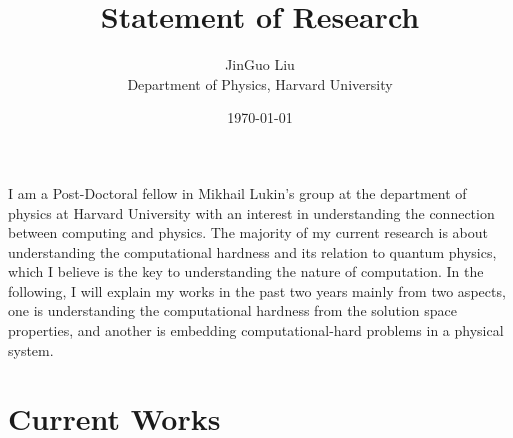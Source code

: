 \documentclass[a4paper]{article}
\title{Statement of Research}
\author{JinGuo Liu\\ Department of Physics, Harvard University}
\date{\today}
\newcommand{\<}{\langle}
\renewcommand{\>}{\rangle}
\begin{document}
\fontsize{10}{13}
\selectfont
\maketitle

I am a Post-Doctoral fellow in Mikhail Lukin's group at the department of physics at Harvard University with an interest in understanding the connection between computing and physics.
The majority of my current research is about understanding the computational hardness and its relation to quantum physics, which I believe is the key to understanding the nature of computation.
In the following, I will explain my works in the past two years mainly from two aspects, one is understanding the computational hardness from the solution space properties, and another is embedding computational-hard problems in a physical system.
\section{Current Works}
\end{document}

